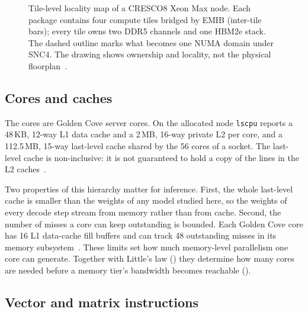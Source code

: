 \begin{figure}[htbp]
{%
}
\endgroup
\caption{Tile-level locality map of a CRESCO8 Xeon Max node.  Each
package contains four compute tiles bridged by EMIB (inter-tile bars); every
tile owns two DDR5 channels and one HBM2e stack.  The dashed outline
marks what becomes one NUMA domain under SNC4.  The drawing shows
ownership and locality, not the physical floorplan~\cite{nassif2022sapphire,intelmaxoverview,lp1738}.}
\label{fig:node-locality}
\end{figure}

\subsection{Cores and caches}
\label{sec:xeon-max-cores}

The cores are Golden Cove server cores.  On the allocated node
\texttt{lscpu} reports a 48\,KB, 12-way L1 data cache and a 2\,MB,
16-way private L2 per core, and a 112.5\,MB, 15-way last-level cache
shared by the 56 cores of a socket.  The last-level cache is
non-inclusive: it is not guaranteed to hold a copy of the lines in the L2
caches~\cite{intelmaxoverview}.

Two properties of this hierarchy matter for inference.  First, the
whole last-level cache is smaller than the weights of any model studied
here, so the weights of every decode step stream from memory rather than
from cache.  Second, the number of misses a core can keep outstanding is
bounded.  Each Golden Cove core has 16 L1 data-cache fill buffers and can
track 48 outstanding misses in its memory subsystem~\cite{anandtech2021goldencove}.  These
limits set how much memory-level parallelism one core can generate.
Together with Little's law () they determine how
many cores are needed before a memory tier's bandwidth becomes reachable
().

\subsection{Vector and matrix instructions}
\label{sec:xeon-max-isa}

